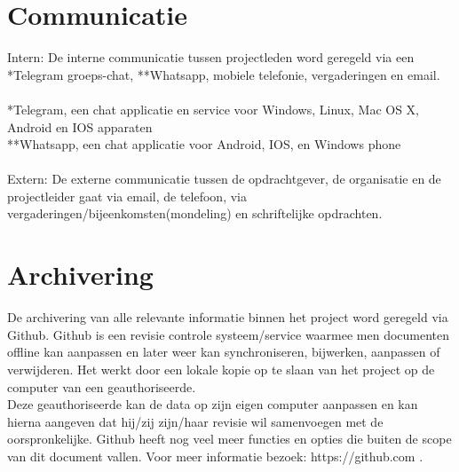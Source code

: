 \documentclass[oneside]{book}
\begin{document}
\section*{Communicatie}
Intern:
De interne communicatie tussen projectleden word geregeld via een *Telegram groeps-chat,
**Whatsapp, mobiele telefonie, vergaderingen en email.\\
\\
 *Telegram, een chat applicatie en service voor Windows, Linux, Mac OS X, Android en IOS apparaten\\
**Whatsapp, een chat applicatie voor Android, IOS, en Windows phone\\
\\
Extern:
De externe communicatie tussen de opdrachtgever, de organisatie en de projectleider gaat via email,
de telefoon, via vergaderingen/bijeenkomsten(mondeling) en schriftelijke opdrachten.

\section*{Archivering}
De archivering van alle relevante informatie binnen het project word geregeld via Github.
Github is een revisie controle systeem/service waarmee men documenten offline kan aanpassen en
later weer kan synchroniseren, bijwerken, aanpassen of verwijderen.
Het werkt door een lokale kopie op te slaan van het project op de computer van een
geauthoriseerde.\\
Deze geauthoriseerde kan de data op zijn eigen computer aanpassen en kan hierna aangeven dat
hij/zij zijn/haar revisie wil samenvoegen met de oorspronkelijke.
Github heeft nog veel meer functies en opties die buiten de scope van dit document vallen.
Voor meer informatie bezoek: https://github.com .
\end{document}
